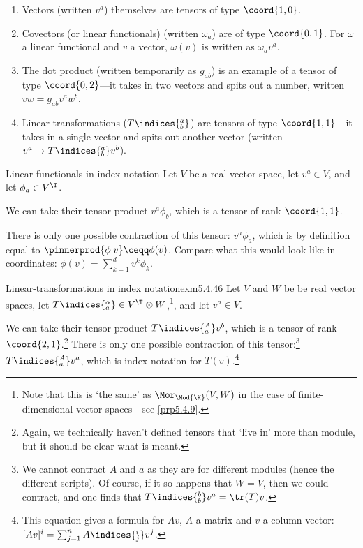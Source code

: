 \begin{exm}{}{}
\begin{enumerate}
	\item Vectors (written $v^a$) themselves are tensors of type $\coord{1,0}$.
	\item Covectors (or linear functionals) (written $\omega _a$) are of type $\coord{0,1}$.  For $\omega$ a linear functional and $v$ a vector, $\omega (v)$ is written as $\omega _av^a$.
	\item The dot product (written temporarily as $g_{ab}$) is an example of a tensor of type $\coord{0,2}$---it takes in two vectors and spits out a number, written $v\dot w=g_{ab}v^aw^b$.
	\item Linear-transformations ($T\indices{^a_b}$) are tensors of type $\coord{1,1}$---it takes in a single vector and spits out another vector (written $v^a\mapsto T\indices{^a_b}v^b$).
\end{enumerate}
\end{exm}
\begin{exm}{Linear-functionals in index notation}{}
Let $V$ be a real vector space, let $v^a\in V$, and let $\phi _a\in V^{\T}$.

We can take their tensor product $v^a\phi _b$, which is a tensor of rank $\coord{1,1}$.

There is only one possible contraction of this tensor:   $v^a\phi _a$, which is by definition equal to $\pinnerprod{\phi |v}\ceqq \phi (v)$.    Compare what this would look like in coordinates:  $\phi (v)=\sum _{k=1}^dv^k\phi _k$.
\end{exm}
\begin{exm}{Linear-transformations in index notation}{exm5.4.46}
Let $V$ and $W$ be be real vector spaces, let $T\indices{^{\alpha}_a}\in V^{\T}\otimes W$,\footnote{Note that this is `the same' as $\Mor _{\Mod{\K}}(V,W)$ in the case of finite-dimensional vector spaces---see \cref{prp5.4.9}.}, and let $v^a\in V$.

We can take their tensor product $T\indices{^{A}_a}v^b$, which is a tensor of rank $\coord{2,1}$.\footnote{Again, we technically haven't defined tensors that `live in' more than module, but it should be clear what is meant.}  There is only one possible contraction of this tensor:\footnote{We cannot contract $A$ and $a$ as they are for different modules (hence the different scripts).  Of course, if it so happens that $W=V$, then we could contract, and one finds that $T\indices{^b_b}v^a=\tr (T)v$.}  $T\indices{^{A}_a}v^a$, which is index notation for $T(v)$.\footnote{This equation gives a formula for $Av$, $A$ a matrix and $v$ a column vector:  $[Av]^i=\sum _{j=1}^nA\indices{^i_j}v^j$.}
\end{exm}
